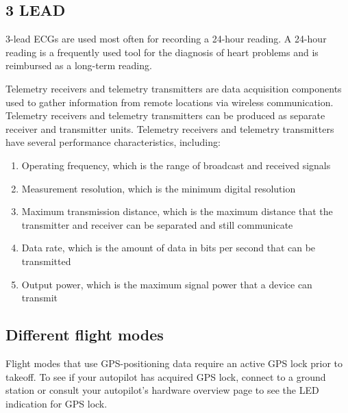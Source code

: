 \documentclass[12pt,a4paper]{report}
\begin{document}
\subsection{3 LEAD}
\hspace*{1cm} 3-lead ECGs are used most often for recording a 24-hour reading. A 24-hour reading is a frequently used tool for the diagnosis of heart problems and is reimbursed as a long-term reading.







\hspace*{1cm}
Telemetry receivers and telemetry transmitters are data acquisition components used to gather information from remote locations via wireless communication. Telemetry receivers and telemetry transmitters can be produced as separate receiver and transmitter units. Telemetry receivers and telemetry transmitters have several performance characteristics, including:\\

\begin{enumerate}
\item Operating frequency, which is the range of broadcast and received signals
 \item Measurement resolution, which is the minimum digital resolution
\item Maximum transmission distance, which is the maximum distance that the transmitter and receiver can be separated and still communicate
\item Data rate, which is the amount of data in bits per second that can be transmitted
\item  Output power, which is the maximum signal power that a device can transmit

\end{enumerate}

\subsection{ Different flight modes}

Flight modes that use GPS-positioning data require an active GPS lock prior to takeoff. To see if your autopilot has acquired GPS lock, connect to a ground station or consult your autopilot’s hardware overview page to see the LED indication for GPS lock.
\end{document}
